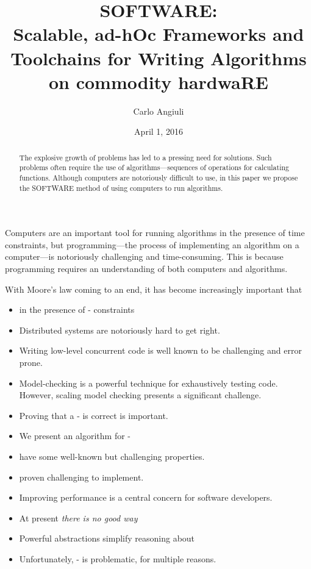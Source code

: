 \documentclass[10pt]{article}
\title{SOFTWARE:\\
Scalable, ad-hOc Frameworks and Toolchains for Writing
Algorithms on commodity hardwaRE}
\author{Carlo Angiuli}
\date{April 1, 2016}
\begin{document}
\maketitle
\begin{abstract}
The explosive growth of problems has led to a pressing need for solutions.
Such problems often require the use of algorithms---sequences of operations
for calculating functions. Although computers are notoriously difficult to use,
in this paper we propose the SOFTWARE method of using computers to run
algorithms.
\end{abstract}

Computers are an important tool for running algorithms in the presence of time
constraints, but programming---the process of implementing an algorithm on a
computer---is notoriously challenging and time-consuming. This is because
programming requires an understanding of both computers and algorithms.

With Moore's law coming to an end, it has become increasingly important that


\begin{itemize}
\item
in the presence of - constraints
\item
Distributed systems are notoriously hard to get right.
\item
Writing low-level concurrent code is well known to be challenging and error prone.
\item
Model-checking is a powerful technique for exhaustively testing code. However,
scaling model checking presents a significant challenge.
\item
Proving that a - is correct is important.
\item
We present an algorithm for -
\item
have some well-known but challenging properties.
\item
proven challenging to implement.
\item
Improving performance is a central concern for software developers.
\item
At present \emph{there is no good way}
\item
Powerful abstractions simplify reasoning about
\item
Unfortunately, - is problematic, for multiple reasons.
\end{itemize}
\end{document}
